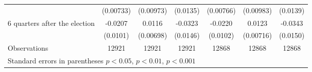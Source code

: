 \begin{table}[!ht]
\begin{tabular}{l*{6}{c}}
                    &   (0.00733)         &   (0.00973)         &    (0.0135)         &   (0.00766)         &   (0.00983)         &    (0.0139)         \\
[0,5em]
 6 quarters after the election&     -0.0207\sym{*}  &      0.0116         &     -0.0323\sym{*}  &     -0.0220\sym{*}  &      0.0123         &     -0.0343\sym{*}  \\
                    &    (0.0101)         &   (0.00698)         &    (0.0146)         &    (0.0102)         &   (0.00716)         &    (0.0150)         \\
\hline
Observations        &       12921         &       12921         &       12921         &       12868         &       12868         &       12868         \\
\hline\hline
\multicolumn{7}{l}{\footnotesize Standard errors in parentheses \sym{*} \(p<0.05\), \sym{**} \(p<0.01\), \sym{***} \(p<0.001\)}\\
\end{tabular}
\end{table}
